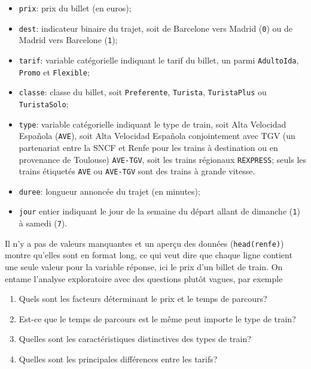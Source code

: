 \documentclass[
  11pt,
  letterpaper,
]{scrbook}
\providecommand{\tightlist}{%
  \setlength{\itemsep}{0pt}\setlength{\parskip}{0pt}}\usepackage{longtable,booktabs,array}
\theoremstyle{definition}
\theoremstyle{remark}
\begin{document}
\begin{itemize}
\tightlist
\item
  \texttt{prix}: prix du billet (en euros);
\item
  \texttt{dest}: indicateur binaire du trajet, soit de Barcelone vers
  Madrid (\texttt{0}) ou de Madrid vers Barcelone (\texttt{1});
\item
  \texttt{tarif}: variable catégorielle indiquant le tarif du billet, un
  parmi \texttt{AdultoIda}, \texttt{Promo} et \texttt{Flexible};
\item
  \texttt{classe}: classe du billet, soit \texttt{Preferente},
  \texttt{Turista}, \texttt{TuristaPlus} ou \texttt{TuristaSolo};
\item
  \texttt{type}: variable catégorielle indiquant le type de train, soit
  Alta Velocidad Española (\texttt{AVE}), soit Alta Velocidad Española
  conjointement avec TGV (un partenariat entre la SNCF et Renfe pour les
  trains à destination ou en provenance de Toulouse) \texttt{AVE-TGV},
  soit les trains régionaux \texttt{REXPRESS}; seuls les trains
  étiquetés \texttt{AVE} ou \texttt{AVE-TGV} sont des trains à grande
  vitesse.
\item
  \texttt{duree}: longueur annoncée du trajet (en minutes);
\item
  \texttt{jour} entier indiquant le jour de la semaine du départ allant
  de dimanche (\texttt{1}) à samedi (\texttt{7}).
\end{itemize}

Il n'y a pas de valeurs manquantes et un aperçu des données
(\texttt{head(renfe)}) montre qu'elles sont en format long, ce qui veut
dire que chaque ligne contient une seule valeur pour la variable
réponse, ici le prix d'un billet de train. On entame l'analyse
exploratoire avec des questions plutôt vagues, par exemple

\begin{enumerate}
\def\labelenumi{\arabic{enumi}.}
\tightlist
\item
  Quels sont les facteurs déterminant le prix et le temps de parcours?
\item
  Est-ce que le temps de parcours est le même peut importe le type de
  train?
\item
  Quelles sont les caractéristiques distinctives des types de train?
\item
  Quelles sont les principales différences entre les tarifs?
\end{enumerate}
\end{document}
